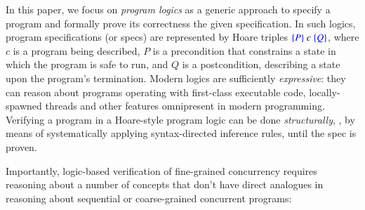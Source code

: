 In this paper, we focus on \emph{program logics} as a generic approach
to specify a program and formally prove its correctness \wrt the given
specification.
%
In such logics, program specifications (or specs) are represented by
Hoare triples $\textcolor{blue}{\left\{{P}\right\}}~c~\textcolor{blue}{\left\{{Q}\right\}}$, where $c$ is a program being
described, $P$ is a precondition that constrains a state in which the
program is safe to run, and $Q$ is a postcondition, describing a state
upon the program's termination.
%
Modern logics are sufficiently \emph{expressive}: they can reason
about programs operating with first-class executable code,
locally-spawned threads and other features omnipresent in modern
programming.
%
Verifying a program in a Hoare-style program logic can be done
\emph{structurally}, \ie, by means of systematically applying
syntax-directed inference rules, until the spec is proven.


Importantly, logic-based verification of fine-grained concurrency
requires reasoning about a number of concepts that don't have direct
analogues in reasoning about sequential or coarse-grained concurrent
programs:

